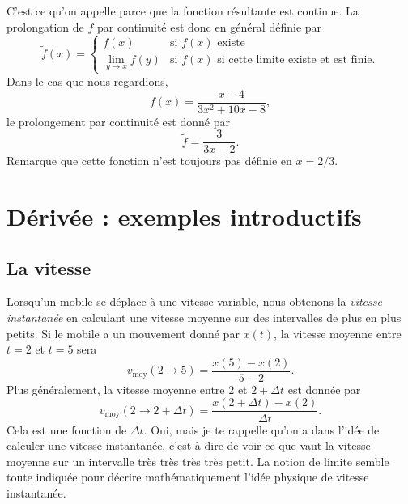 C'est ce qu'on appelle  parce que la fonction résultante est continue. La prolongation de $f$ par continuité est donc en général définie par
\begin{equation}
\tilde f(x)=
\begin{cases}
f(x)            &\text{si $f(x)$ existe}\\
\lim_{y\to x}f(y)   &\text{si $f(x)$ si cette limite existe et est finie.}
\end{cases}
\end{equation}
Dans le cas que nous regardions, 
\[ 
    f(x)=\frac{ x+4 }{ 3x^2+10x-8 },
\]
le prolongement par continuité est donné par
\begin{equation}
\tilde f =\frac{ 3 }{ 3x-2 }.
\end{equation}
Remarque que cette fonction n'est toujours pas définie en $x=2/3$. 

\section{Dérivée : exemples introductifs}

\subsection{La vitesse}

Lorsqu'un mobile se déplace à une vitesse variable, nous obtenons la \emph{vitesse instantanée} en calculant une vitesse moyenne sur des intervalles de plus en plus petits. Si le mobile a un mouvement donné par $x(t)$, la vitesse moyenne entre $t=2$ et $t=5$ sera
\[ 
  v_{\text{moy}}(2\to 5)=\frac{ x(5)-x(2) }{ 5-2 }.
\]
Plus généralement, la vitesse moyenne entre $2$ et $2+\Delta t$ est donnée par
\[ 
  v_{\text{moy}}(2\to 2+\Delta t)=\frac{ x(2+\Delta t)-x(2) }{ \Delta t }.
\]
Cela est une fonction de $\Delta t$. Oui, mais je te rappelle qu'on a dans l'idée de calculer une vitesse instantanée, c'est à dire de voir ce que vaut la vitesse moyenne sur un intervalle très {\small très} {\footnotesize très} {\scriptsize très} {\tiny petit}. La notion de limite semble toute indiquée pour décrire mathématiquement l'idée physique de vitesse instantanée.

